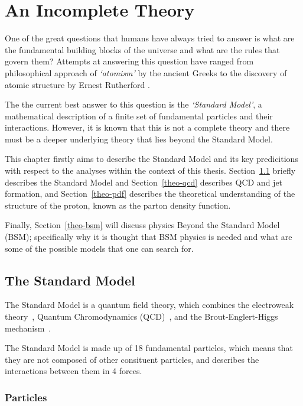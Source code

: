 \chapter{An Incomplete Theory}
\label{sec:theo}

One of the great questions that humans have always tried to answer is
what are the fundamental building blocks of the universe and what are the rules that govern them?
Attempts at answering this question have ranged from
philosophical approach of \textit{`atomism'} by the ancient Greeks \cite{theo-atomism}
to the discovery of atomic structure by Ernest Rutherford \cite{theo-rutherford}.

The the current best answer to this question is the \textit{`Standard Model'},
a mathematical description of a finite set of fundamental particles and their interactions.
However, it is known that this is not a complete theory and there must be
a deeper underlying theory that lies beyond the Standard Model.

This chapter firstly aims to describe the Standard Model and its key predicitions
with respect to the analyses within the context of this thesis.
Section~\ref{theo-sm} briefly describes the Standard Model and
Section~\ref{theo-qcd} describes QCD and jet formation,
and Section~\ref{theo-pdf} describes the theoretical understanding
of the structure of the proton, known as the parton density function.

Finally, Section~\ref{theo-bsm} will discuss physics Beyond the Standard Model (BSM);
specifically why it is thought that BSM physics is needed
and what are some of the possible models that one can search for.

\section{The Standard Model}
\label{theo-sm}

The Standard Model is a quantum field theory,
which combines the electroweak theory~\cite{theo-glashow},
Quantum Chromodynamics (QCD)~\cite{theo-qcd},
and the Brout-Englert-Higgs mechanism~\cite{theo-be,theo-higgs}.

The Standard Model is made up of 18 fundamental particles,
which means that they are not composed of other consituent particles,
and describes the interactions between them in 4 forces.

\subsection{Particles}


